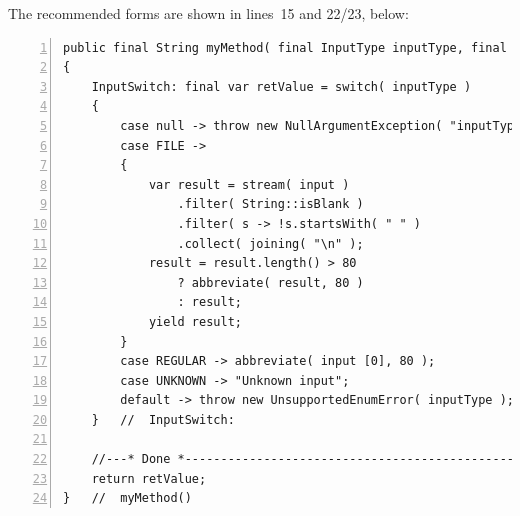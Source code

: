 \documentclass[11pt,a4paper, titlepage, parskip=half, headsepline, footsepline, cleardoublepage=current, headheight=1cm]{scrbook}
\begin{document}
The recommended forms are shown in lines~15 and 22/23, below:
\begin{lstlisting}[numbers=left]
public final String myMethod( final InputType inputType, final String... input )
{
    InputSwitch: final var retValue = switch( inputType )
    {
        case null -> throw new NullArgumentException( "inputType" );
        case FILE -> 
        {
            var result = stream( input )
                .filter( String::isBlank )
                .filter( s -> !s.startsWith( " " )
                .collect( joining( "\n" );
            result = result.length() > 80
                ? abbreviate( result, 80 )
                : result;
            yield result;    
        }
        case REGULAR -> abbreviate( input [0], 80 );
        case UNKNOWN -> "Unknown input";
        default -> throw new UnsupportedEnumError( inputType );
    }   //  InputSwitch:
    
    //---* Done *----------------------------------------------------
    return retValue;
}   //  myMethod()
\end{lstlisting}

\end{document}
